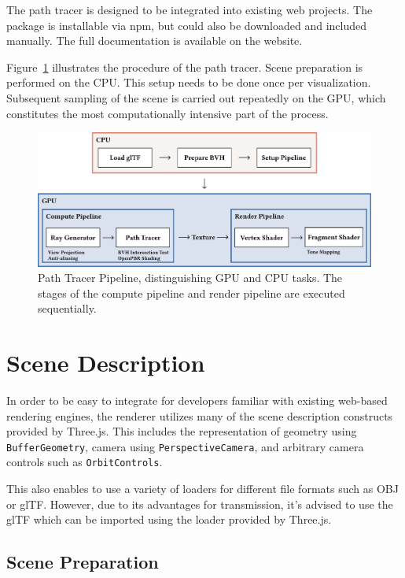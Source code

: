 The path tracer is designed to be integrated into existing web projects. The package is installable via \gls{npm}, but could also be downloaded and included manually. The full documentation is available on the website.

Figure~\ref{fig:path-tracer} illustrates the procedure of the path tracer. Scene preparation is performed on the CPU. This setup needs to be done once per visualization. Subsequent sampling of the scene is carried out repeatedly on the GPU, which constitutes the most computationally intensive part of the process.

\begin{figure}[H]
    \includegraphics[width=1.0\columnwidth]{resources/path-tracer-pipeline.png}
    \caption{Path Tracer Pipeline, distinguishing GPU and CPU tasks. The stages of the compute pipeline and render pipeline are executed sequentially.}
    \label{fig:path-tracer}
\end{figure}

\section{Scene Description}

In order to be easy to integrate for developers familiar with existing web-based rendering engines, the renderer utilizes many of the scene description constructs provided by \gls{Three.js}. This includes the representation of geometry using \texttt{BufferGeometry}, camera using \texttt{PerspectiveCamera}, and arbitrary camera controls such as \texttt{OrbitControls}.

This also enables to use a variety of loaders for different file formats such as \gls{OBJ} or \gls{glTF}. However, due to its advantages for transmission, it's advised to use the \gls{glTF} which can be imported using the loader provided by \gls{Three.js}.

\subsection*{Scene Preparation}


